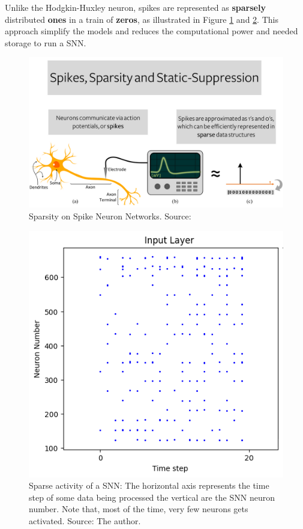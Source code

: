		\par Unlike the Hodgkin-Huxley neuron, spikes are represented as \textbf{sparsely} distributed \textbf{ones} in a train of \textbf{zeros}, as illustrated in Figure \ref{fig:spikessparsitystaticsupress} and \ref{fig:sparsity}. This approach simplify the models and reduces the computational power and needed storage to run a SNN.\newline
		
		\begin{figure}[H]
			\centering
			\includegraphics[width=\linewidth]{images/spikesSparsityStaticSupress}
			\caption{Sparsity on Spike Neuron Networks. Source: \cite{10242251}}
			\label{fig:spikessparsitystaticsupress}
		\end{figure}
		
		\begin{figure}[H]
			\centering
			\includegraphics[width=.5\linewidth]{images/sparsity}
			\caption[Sparse activity of a SNN]{Sparse activity of a SNN: The horizontal axis represents the time step of some data being processed the vertical are the SNN neuron number. Note that, most of the time, very few neurons gets activated. Source: The author.}
			\label{fig:sparsity}
		\end{figure}
		
